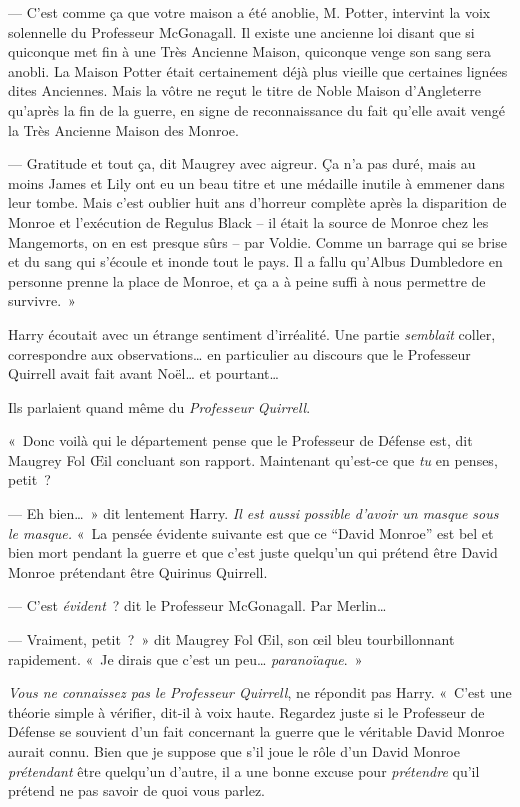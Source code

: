 --- C'est comme ça que votre maison a été anoblie, M. Potter, intervint la voix solennelle du Professeur McGonagall.
Il existe une ancienne loi disant que si quiconque met fin à une Très Ancienne Maison, quiconque venge son sang sera anobli.
La Maison Potter était certainement déjà plus vieille que certaines lignées dites Anciennes.
Mais la vôtre ne reçut le titre de Noble Maison d'Angleterre qu'après la fin de la guerre, en signe de reconnaissance du fait qu'elle avait vengé la Très Ancienne Maison des Monroe.

--- Gratitude et tout ça, dit Maugrey avec aigreur.
Ça n'a pas duré, mais au moins James et Lily ont eu un beau titre et une médaille inutile à emmener dans leur tombe.
Mais c'est oublier huit ans d'horreur complète après la disparition de Monroe et l'exécution de Regulus Black -- il était la source de Monroe chez les Mangemorts, on en est presque sûrs -- par Voldie.
Comme un barrage qui se brise et du sang qui s'écoule et inonde tout le pays.
Il a fallu qu'Albus Dumbledore en personne prenne la place de Monroe, et ça a à peine suffi à nous permettre de survivre.~»

Harry écoutait avec un étrange sentiment d'irréalité.
Une partie \emph{semblait} coller, correspondre aux observations… en particulier au discours que le Professeur Quirrell avait fait avant Noël… et pourtant…

Ils parlaient quand même du \emph{Professeur Quirrell}.

«~Donc voilà qui le département pense que le Professeur de Défense est, dit Maugrey Fol Œil concluant son rapport.
Maintenant qu'est-ce que \emph{tu} en penses, petit~?

--- Eh bien…~»
dit lentement Harry.
\emph{Il est aussi possible d'avoir un masque sous le masque.} «~La pensée évidente suivante est que ce “David Monroe” est bel et bien mort pendant la guerre et que c'est juste quelqu'un qui prétend être David Monroe prétendant être Quirinus Quirrell.

--- C'est \emph{évident}~? dit le Professeur McGonagall.
Par Merlin…

--- Vraiment, petit~?~»
dit Maugrey Fol Œil, son œil bleu tourbillonnant rapidement.
«~Je dirais que c'est un peu…
\emph{paranoïaque}.~»

\emph{Vous ne connaissez pas le Professeur Quirrell}, ne répondit pas Harry.
«~C'est une théorie simple à vérifier, dit-il à voix haute.
Regardez juste si le Professeur de Défense se souvient d'un fait concernant la guerre que le véritable David Monroe aurait connu.
Bien que je suppose que s'il joue le rôle d'un David Monroe \emph{prétendant} être quelqu'un d'autre, il a une bonne excuse pour \emph{prétendre} qu'il prétend ne pas savoir de quoi vous parlez.

